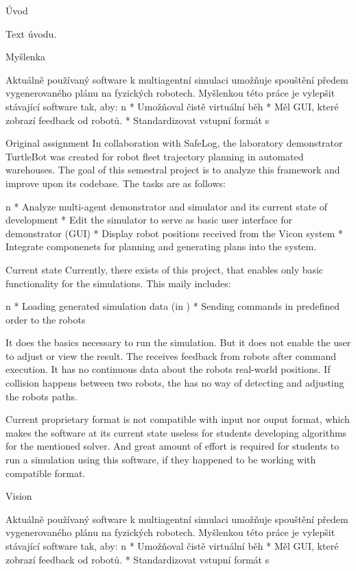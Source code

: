 \chap Úvod


Text úvodu.

\sec Myšlenka

Aktuálně používaný software k multiagentní simulaci umožňuje spouštění předem vygenerovaného plánu na fyzických robotech. Myšlenkou této práce je vylepšit stávající software tak, aby:
\begitems \style n
    * Umožňoval čistě virtuální běh
    * Měl GUI, které zobrazí feedback od robotů.
    * Standardizovat vstupní formát s \mapfIR
\enditems

\sec Original assignment
In collaboration with SafeLog, the laboratory demonstrator TurtleBot was created for robot fleet trajectory planning in automated warehouses. The goal of this semestral project is to analyze this framework and improve upon its codebase. The tasks are as follows:

\begitems \style n
    * Analyze multi-agent demonstrator and simulator {\mapfIR} and its current state of development 
    * Edit the simulator to serve as basic user interface for demonstrator (GUI)
    * Display robot positions received from the Vicon system
    * Integrate componenets for planning and generating plans into the system.
\enditems

\sec Current state
Currently, there exists {\oldRepo} of this project, that enables only basic functionality for the simulations. This maily includes:

\begitems \style n
    * Loading generated simulation data (in {\oldFormat})
    * Sending commands in predefined order to the robots
\enditems

It does the basics necessary to run the simulation. But it does not enable the user to adjust or view the result. The {\oldRepo} receives feedback from robots after command execution. It has no continuous data about the robots real-world positions. If collision happens between two robots, the {\oldRepo} has no way of detecting and adjusting the robots paths.

Current proprietary format is not compatible with {\mapfIR} input nor ouput format, which makes the software at its current state useless for students developing algorithms for the mentioned solver. And great amount of effort is required for students to run a simulation using this software, if they happened to be working with compatible format.

\sec Vision



Aktuálně používaný software k multiagentní simulaci umožňuje spouštění předem vygenerovaného plánu na fyzických robotech. Myšlenkou této práce je vylepšit stávající software tak, aby:
\begitems \style n
    * Umožňoval čistě virtuální běh
    * Měl GUI, které zobrazí feedback od robotů.
    * Standardizovat vstupní formát s \mapfIR
\enditems




\bye
\endtt
